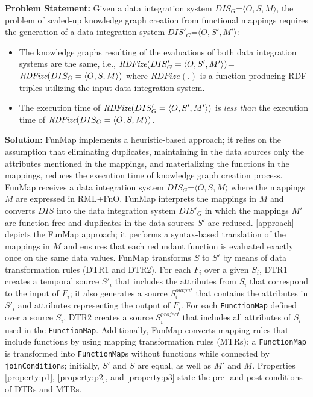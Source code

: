 \noindent\textbf{Problem Statement:} 
Given a data integration system $DIS_G$=$\langle O,S,M\rangle$, the problem of scaled-up knowledge graph creation from functional mappings requires the generation of a data integration system 
$DIS'_G$=$\langle O,S',M' \rangle$:
\begin{itemize}
\renewcommand{\labelitemi}{$\bullet$}
\item The knowledge graphs resulting of the evaluations of both data integration systems are the same, i.e., $\emph{RDFize}(DIS'_G = \langle O,S',M' \rangle)$=$\emph{RDFize}(DIS_G = \langle O,S,M \rangle)$ where $RDFize(.)$ is a function producing RDF triples utilizing the input data integration system.
\item The execution time of $\emph{RDFize}(DIS'_G=\langle O,S',M' \rangle)$ is \emph{less than} the execution time of $\emph{RDFize}(DIS_G=\langle O,S,M \rangle)$.
\end{itemize}

\noindent \textbf{Solution:} FunMap implements a heuristic-based approach; it relies on the assumption that eliminating duplicates, maintaining in the data sources only the attributes mentioned in the mappings, and materializing the functions in the mappings, reduces the execution time of knowledge graph creation process. 
FunMap receives a data integration system $DIS_G$=$\langle O,S,M \rangle$ where the mappings $M$ are expressed in RML+FnO. FunMap interprets the mappings in $M$ and converts $DIS$ into the data integration system $DIS'_G$ in which the mappings $M'$ are function free and duplicates in the data sources $S'$ are reduced. \autoref{approach} depicts the FunMap approach; it performs a syntax-based translation of the mappings in $M$ and ensures that each redundant function is evaluated exactly once on the same data values. 
FunMap transforms $S$ to $S'$ by means of data transformation rules (DTR1 and DTR2). For each $F_i$ over a given $S_i$, DTR1 creates a temporal source $S'_i$ that includes the attributes from $S_i$ that correspond to the input of $F_i$; it also generates a source $S_i^{output}$ that contains the attributes in $S'_i$ and attributes representing the output of $F_i$. For each \verb|FunctionMap| defined over a source $S_i$, DTR2 creates a source $S_i^{project}$ that includes all attributes of $S_i$ used in the \verb|FunctionMap|. Additionally, FunMap converts mapping rules that include functions by using mapping transformation rules (MTRs); a \verb|FunctionMap| is transformed into \verb|FunctionMap|s without functions while connected by \verb|joinCondition|s; initially, $S'$ and $S$ are equal, as well as $M'$ and $M$. Properties \ref{property:p1}, \ref{property:p2}, and \ref{property:p3} state the pre- and post-conditions of DTRs and MTRs.

